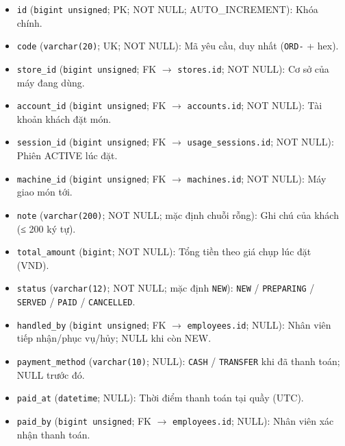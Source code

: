 \begin{itemize}

\item \texttt{id} (\texttt{bigint unsigned}; PK; NOT NULL; AUTO_INCREMENT): Khóa chính.

\item \texttt{code} (\texttt{varchar(20)}; UK; NOT NULL): Mã yêu cầu, duy nhất (\texttt{ORD-} + hex).

\item \texttt{store\_id} (\texttt{bigint unsigned}; FK $\rightarrow$ \texttt{stores.id}; NOT NULL): Cơ sở của máy đang dùng.

\item \texttt{account\_id} (\texttt{bigint unsigned}; FK $\rightarrow$ \texttt{accounts.id}; NOT NULL): Tài khoản khách đặt món.

\item \texttt{session\_id} (\texttt{bigint unsigned}; FK $\rightarrow$ \texttt{usage\_sessions.id}; NOT NULL): Phiên ACTIVE lúc đặt.

\item \texttt{machine\_id} (\texttt{bigint unsigned}; FK $\rightarrow$ \texttt{machines.id}; NOT NULL): Máy giao món tới.

\item \texttt{note} (\texttt{varchar(200)}; NOT NULL; mặc định chuỗi rỗng): Ghi chú của khách (≤ 200 ký tự).

\item \texttt{total\_amount} (\texttt{bigint}; NOT NULL): Tổng tiền theo giá chụp lúc đặt (VND).

\item \texttt{status} (\texttt{varchar(12)}; NOT NULL; mặc định \texttt{NEW}): \texttt{NEW} / \texttt{PREPARING} / \texttt{SERVED} / \texttt{PAID} / \texttt{CANCELLED}.

\item \texttt{handled\_by} (\texttt{bigint unsigned}; FK $\rightarrow$ \texttt{employees.id}; NULL): Nhân viên tiếp nhận/phục vụ/hủy; NULL khi còn NEW.

\item \texttt{payment\_method} (\texttt{varchar(10)}; NULL): \texttt{CASH} / \texttt{TRANSFER} khi đã thanh toán; NULL trước đó.

\item \texttt{paid\_at} (\texttt{datetime}; NULL): Thời điểm thanh toán tại quầy (UTC).

\item \texttt{paid\_by} (\texttt{bigint unsigned}; FK $\rightarrow$ \texttt{employees.id}; NULL): Nhân viên xác nhận thanh toán.


\end{itemize}
